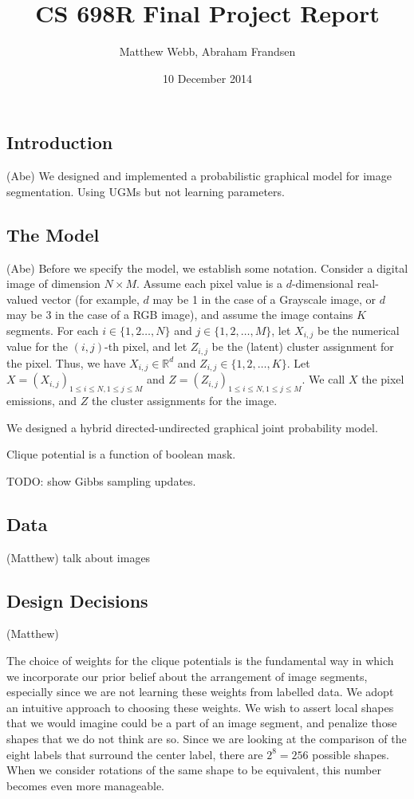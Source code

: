 \documentclass[12pt]{article}
\begin{document}
\title{CS 698R Final Project Report}
\author{Matthew Webb, Abraham Frandsen}
\date{10 December 2014}

\maketitle

\subsection*{Introduction} (Abe)
We designed and implemented a probabilistic graphical model for image segmentation.
Using UGMs but not learning parameters.


\subsection*{The Model}(Abe)
Before we specify the model, we establish some notation. 
Consider a digital image of dimension $N \times M$.
Assume each pixel value is a $d$-dimensional real-valued vector
(for example, $d$ may be 1 in the case of a Grayscale image, or $d$ may be 3 in the
case of a RGB image), and assume the image contains $K$ segments.
For each $i \in \{1,2\ldots,N\}$ and $j \in \{1,2,\ldots,M\}$,
let $X_{i,j}$ be the numerical value for the $(i,j)$-th pixel, 
and let $Z_{i,j}$ be the (latent) cluster assignment for the pixel. 
Thus, we have $X_{i,j} \in \mathbb{R}^d$ and $Z_{i,j} \in \{1,2,\ldots,K\}$. 
Let $X = (X_{i,j})_{1\leq i \leq N, 1 \leq j \leq M}$ and 
$Z=(Z_{i,j})_{1\leq i \leq N, 1 \leq j \leq M}$. We call $X$ the pixel emissions,
and $Z$ the cluster assignments for the image.

We designed a hybrid directed-undirected graphical joint probability model.

Clique potential is a function of boolean mask.

TODO: show Gibbs sampling updates. 

\subsection*{Data}(Matthew)
talk about images

\subsection*{Design Decisions}(Matthew)

The choice of weights for the clique potentials is the fundamental way in which
we incorporate our prior belief about the arrangement of image segments,
especially since we are not learning these weights from labelled data. We adopt
an intuitive approach to choosing these weights. We wish to assert local shapes
that we would imagine could be a part of an image segment, and penalize those
shapes that we do not think are so. Since we are looking at the comparison of
the eight labels that surround the center label, there are $2^8 = 256$ possible
shapes. When we consider rotations of the same shape to be equivalent, this
number becomes even more manageable.
\end{document}
